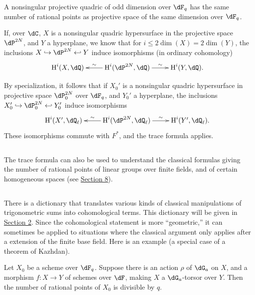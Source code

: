 A nonsingular projective quadric of odd dimension over \texorpdfstring{$\dF_q$}{Fq} has the same number of rational points as projective space of the same dimension over \texorpdfstring{$\dF_q$}{Fq}.

If, over $\dC$, $X$ is a nonsingular quadric hypersurface in 
the projective space $\dP^{2 N}$, and $Y$ a hyperplane, we know that for 
$i\leqslant 2\dim(X)=2\dim(Y)$, the inclusions 
$X\hookrightarrow \dP^{2 N}\hookleftarrow Y$ induce isomorphisms (in 
ordinary cohomology) 
\[\xymatrix{
  \h^i(X,\dQ) 
    & \ar[l]_-\sim \h^i(\dP^{2 N},\dQ) \ar[r]^-\sim 
    & \h^i(Y,\dQ) \text{.}
}\]

By specialization, it follows that if $X_0'$ is a nonsingular quadric 
hypersurface in projective space $\dP_0^{2 N}$ over $\dF_q$, 
and $Y_0'$ a hyperplane, the inclusions 
$X_0'\hookrightarrow \dP_0^{2 N}\hookleftarrow Y_0'$ induce 
isomorphisms 
\[\xymatrix{
  \h^i(X',\dQ_\ell) 
    & \ar[l]_-\sim \h^i(\dP^{2 N},\dQ_\ell) \ar[r]^-\sim 
    & \h^i(Y',\dQ_\ell) \text{.}
}\]
These isomorphisms commute with $F^\ast$, and the trace formula applies. 





\subsection{}\label{VI:1-11}

The trace formula can also be used to understand the classical formulas 
giving the number of rational points of linear groups over 
finite fields, and of certain homogeneous spaces (see \hyperref[VI:8]{Section 8}). 





\subsection{}\label{VI:1-12}

There is a dictionary that translates various kinds of classical 
manipulations of trigonometric sums into cohomological terms. This dictionary 
will be given in \hyperref[VI:2]{Section 2}. Since the cohomological statement is more 
``geometric,'' it can sometimes be applied 
to situations where the classical argument only applies after a 
extension of the finite base field. Here is an example (a special case of a 
theorem of Kazhdan).

\begin{theorem_}[Kazhdan]\label{VI:1-13}
Let $X_0$ be a scheme over $\dF_q$. Suppose there is an action $\rho$ of 
$\dG_a$ on $X$, and a morphism $f:X\to Y$ of schemes over $\dF$, making 
$X$ a $\dG_a$-torsor over $Y$. Then the number of rational points of $X_0$ 
is divisible by $q$.
\end{theorem_}

